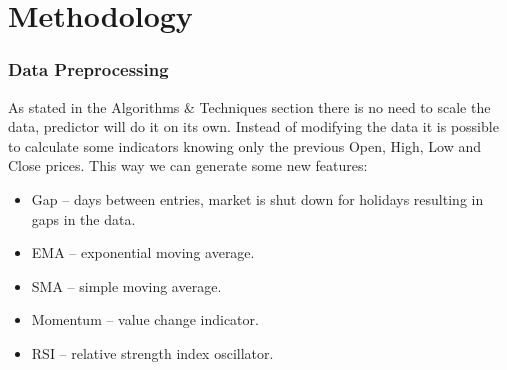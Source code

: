 \documentclass[a4paper,12pt]{article}
\begin{document}

\part{Methodology}
\section{Data Preprocessing}
As stated in the Algorithms \& Techniques section there is no need to scale the data, predictor will do it on its own.
Instead of modifying the data it is possible to calculate some indicators knowing only the previous Open, High, Low and Close prices. This way we can generate some new features:
\begin{itemize}
	\item Gap -- days between entries, market is shut down for holidays resulting in gaps in the data.
	\item EMA -- exponential moving average.
	\item SMA -- simple moving average.
	\item Momentum -- value change indicator.
	\item RSI -- relative strength index oscillator.
\end{itemize}
\end{document}

